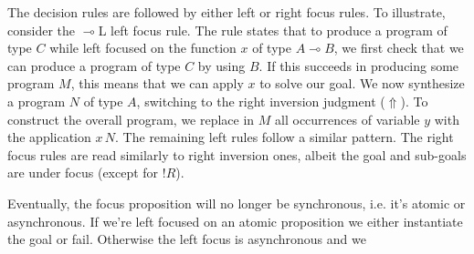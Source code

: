 \documentclass{llncs}
\newcommand{\lolli}{\multimap}
\newcommand{\tensor}{\otimes}
\newcommand{\bang}{{!}}
\begin{document}
The decision rules are followed by either left or right focus rules.
To illustrate, consider the $\lolli$L left focus rule. The rule
states that to produce a program of type $C$ while left focused on
the function $x$ of type $A\lolli B$, we first check that we can produce a
program of type $C$ by using $B$. If this succeeds in producing some
program $M$, this means that we can apply $x$ to solve our
goal. We now synthesize a program $N$ of type $A$, switching to the
right inversion judgment ($\Uparrow$). To construct the overall
program, we replace in $M$ all occurrences of variable $y$ with the
application $x\,N$. The remaining left rules follow a similar
pattern. The right focus rules are read similarly to right inversion ones,
albeit the goal and sub-goals are under focus (except for $\bang R$).
%
%
Eventually, the focus proposition will no longer be synchronous, i.e. it's
atomic or asynchronous. If we're left focused on an atomic proposition we either
instantiate the goal or fail. Otherwise the left focus is asynchronous and we
\end{document}
